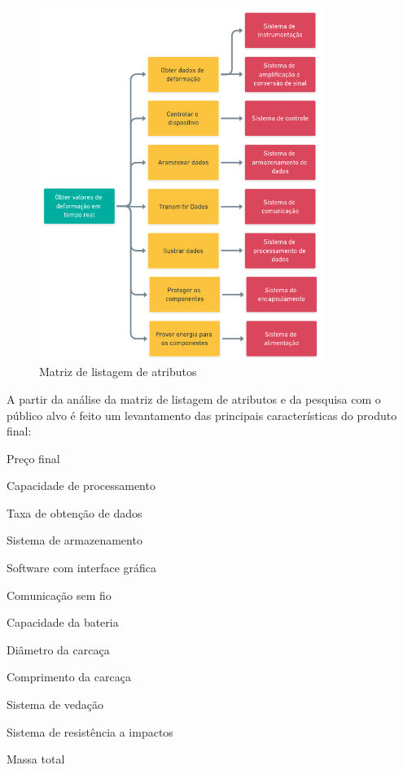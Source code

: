 \begin{figure}[!hb]
	\caption{\label{fig:2031} Matriz de listagem de atributos}
	\begin{center}
		\includegraphics[width=350]{pictures/2031.png}
	\end{center}
\end{figure}

A partir da análise da matriz de listagem de atributos e da pesquisa com o público alvo é feito um levantamento das principais características do produto final:

\begin{alineas}

	\item Preço final
	\item Capacidade de processamento
	\item Taxa de obtenção de dados
	\item Sistema de armazenamento
	\item Software com interface gráfica
	\item Comunicação sem fio
	\item Capacidade da bateria
	\item Diâmetro da carcaça
	\item Comprimento da carcaça
	\item Sistema de vedação
	\item Sistema de resistência a impactos
	\item Massa total

\end{alineas}

